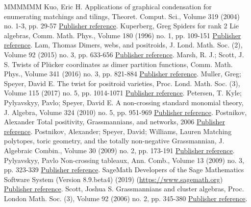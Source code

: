 \begin{thebibliography}{MMMMMM}
 Kuo, Eric H. Applications of graphical condensation for enumerating matchings and tilings, Theoret. Comput. Sci., Volume 319 (2004) no. 1-3, pp. 29-57 \href{https://alco.centre-mersenne.org/articles/10.5802/alco.376/#kuo04}{Publisher reference}.
 Kuperberg, Greg Spiders for rank 2 Lie algebras, Comm. Math. Phys., Volume 180 (1996) no. 1, pp. 109-151 \href{https://alco.centre-mersenne.org/articles/10.5802/alco.376/#kup96}{Publisher reference}.
 Lam, Thomas Dimers, webs, and positroids, J. Lond. Math. Soc. (2), Volume 92 (2015) no. 3, pp. 633-656 \href{https://alco.centre-mersenne.org/articles/10.5802/alco.376/#lam2015}{Publisher reference}.
 Marsh, R. J.; Scott, J. S. Twists of Plücker coordinates as dimer partition functions, Comm. Math. Phys., Volume 341 (2016) no. 3, pp. 821-884 \href{https://alco.centre-mersenne.org/articles/10.5802/alco.376/#marshscott2016}{Publisher reference}.
 Muller, Greg; Speyer, David E. The twist for positroid varieties, Proc. Lond. Math. Soc. (3), Volume 115 (2017) no. 5, pp. 1014-1071 \href{https://alco.centre-mersenne.org/articles/10.5802/alco.376/#mullerspeyer}{Publisher reference}.
 Petersen, T. Kyle; Pylyavskyy, Pavlo; Speyer, David E. A non-crossing standard monomial theory, J. Algebra, Volume 324 (2010) no. 5, pp. 951-969 \href{https://alco.centre-mersenne.org/articles/10.5802/alco.376/#PPS}{Publisher reference}.
 Postnikov, Alexander Total positivity, Grassmannians, and networks, 2006 \href{https://alco.centre-mersenne.org/articles/10.5802/alco.376/#p06}{Publisher reference}.
 Postnikov, Alexander; Speyer, David; Williams, Lauren Matching polytopes, toric geometry, and the totally non-negative Grassmannian, J. Algebraic Combin., Volume 30 (2009) no. 2, pp. 173-191 \href{https://alco.centre-mersenne.org/articles/10.5802/alco.376/#PSW}{Publisher reference}.
 Pylyavskyy, Pavlo Non-crossing tableaux, Ann. Comb., Volume 13 (2009) no. 3, pp. 323-339 \href{https://alco.centre-mersenne.org/articles/10.5802/alco.376/#pylyavskyy2009non}{Publisher reference}.
 SageMath Developers of the Sage Mathematics Software System (Version 8.9.beta4) (2019) (\url{https://www.sagemath.org}) \href{https://alco.centre-mersenne.org/articles/10.5802/alco.376/#sagemath}{Publisher reference}.
 Scott, Joshua S. Grassmannians and cluster algebras, Proc. London Math. Soc. (3), Volume 92 (2006) no. 2, pp. 345-380 \href{https://alco.centre-mersenne.org/articles/10.5802/alco.376/#s06}{Publisher reference}.

\end{thebibliography}
